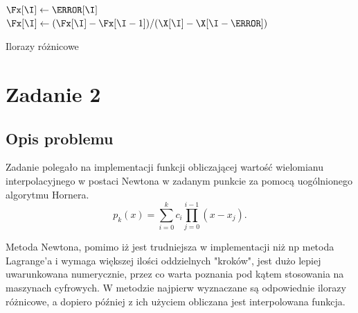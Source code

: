\documentclass{classrep}
\begin{document}
		\begin{algorithm}[!h]
			
		    	
    			\Fun{\iloraz{\X, \F}} {
    				 {
		    			$\Fx[\I]\gets\F[\I]$\;
		    		}
		    		 {
			    		\For{\I $\gets$\N \KwDownTo \I} {
			    			$\Fx[\I] \gets (\Fx[\I] - \Fx[\I - 1]) / (\X[\I] - \X[\I - \J])$\;
		    			}
		    		}
				\KwRet \Fx\;
		    }
    			\caption{Ilorazy różnicowe}
    			\label{algo:1}
		\end{algorithm}		
	
\section{Zadanie 2}
	\subsection{Opis problemu}
		Zadanie polegało na implementacji funkcji obliczającej wartość wielomianu interpolacyjnego w postaci Newtona w zadanym punkcie za pomocą uogólnionego algorytmu Hornera.
		$$p_k(x) = \sum_{i=0}^k c_i \prod_{j=0}^{i-1}(x-x_j).$$
		
		Metoda Newtona, pomimo iż jest trudniejsza w implementacji niż np metoda Lagrange'a i wymaga większej ilości oddzielnych "kroków", jest dużo lepiej uwarunkowana numerycznie, przez co warta poznania pod kątem stosowania na maszynach cyfrowych. W metodzie najpierw wyznaczane są odpowiednie ilorazy różnicowe, a dopiero później z ich użyciem obliczana jest interpolowana funkcja.
		
\end{document}
